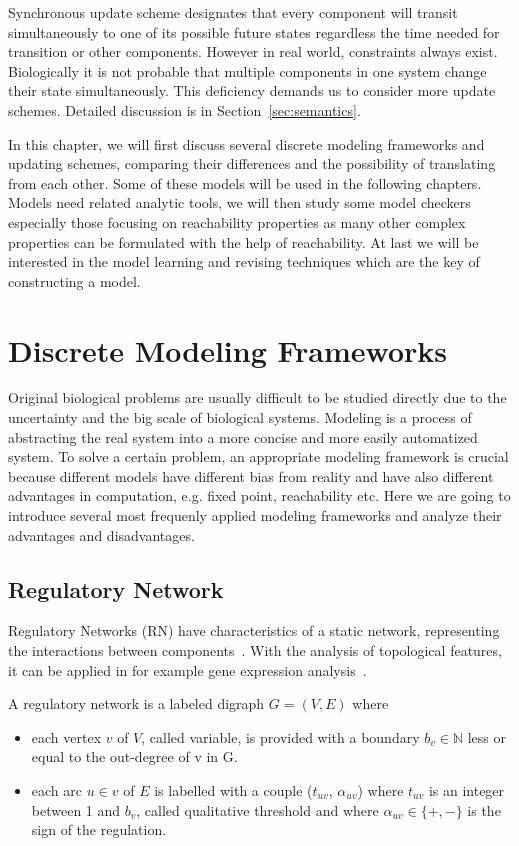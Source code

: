 Synchronous update scheme designates that every component will transit simultaneously to one of its possible future states regardless the time needed for transition or other components.
However in real world, constraints always exist.
Biologically it is not probable that multiple components in one system change their state simultaneously.
This deficiency demands us to consider more update schemes.
Detailed discussion is in Section~\ref{sec:semantics}.

In this chapter, we will first discuss several discrete modeling frameworks and updating schemes, comparing their differences and the possibility of translating from each other.
Some of these models will be used in the following chapters.
Models need related analytic tools, we will then study some model checkers especially those focusing on reachability properties as many other complex properties can be formulated with the help of reachability.
At last we will be interested in the model learning and revising techniques which are the key of constructing a model.

\section{Discrete Modeling Frameworks}
Original biological problems are usually difficult to be studied directly due to the uncertainty and the big scale of biological systems. 
Modeling is a process of abstracting the real system into a more concise and more easily automatized system.
To solve a certain problem, an appropriate modeling framework is crucial because different models have different bias from reality and have also different advantages in computation, e.g. fixed point, reachability etc.
Here we are going to introduce several most frequenly applied modeling frameworks and analyze their advantages and disadvantages.

\subsection{Regulatory Network}\label{sec:regNetwork}
Regulatory Networks (RN) have characteristics of a static network, representing the interactions between components~\cite{bernot2009}.
With the analysis of topological features, it can be applied in for example gene expression analysis~\cite{shinozaki2003regulatory}.

\begin{definition}\label{def:RN}
A regulatory network is a labeled digraph $G=(V,E)$ where 
\begin{itemize}
    \item each vertex $v$ of $V$, called variable, is provided with a boundary $b_v\in \mathbb{N}$ less or equal to the out-degree of v in G.
    \item each arc $u\in v$ of $E$ is labelled with a couple ($t_{uv}$, $\alpha_{uv}$) where $t_{uv}$ is an integer between 1 and $b_v$, called qualitative threshold and where $\alpha_{uv}\in \{+,-\}$ is the sign of the regulation.
\end{itemize}
\end{definition}

